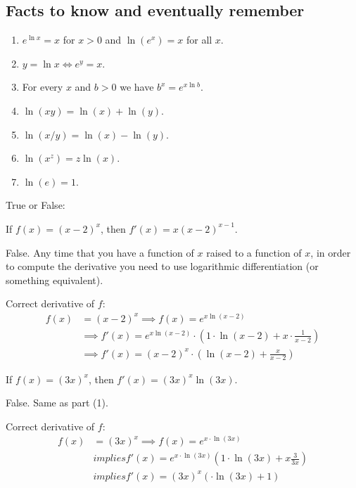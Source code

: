 \documentclass[handout,nooutcomes]{ximera}
\renewenvironment{freeResponse}{
\ifhandout\setbox0\vbox\bgroup\else
\begin{trivlist}\item[\hskip \labelsep\bfseries Solution:\hspace{2ex}]
\fi}
{\ifhandout\egroup\else
\end{trivlist}
\fi}
\begin{document}
\subsection*{Facts to know and eventually remember}
\begin{enumerate}
  \item[(1)]
    $e^{\ln x} = x$ for $x > 0$ and $\ln(e^x) = x$ for all $x$.

  \item[(2)]
    $y = \ln x \iff e^y = x$.

  \item[(3)]
    For every $x$ and $b >0$ we have
    $
      b^x = e^{x \ln b}
    $.

  \item[(4)]
    $\ln(xy) = \ln(x) + \ln(y)$.

  \item[(5)]
    $\ln(x/y) = \ln(x) - \ln(y)$.

  \item[(6)]
    $\ln(x^z) = z \ln(x)$.

  \item[(7)]
    $\ln(e) = 1$.
\end{enumerate}

\begin{problem}
  True or False:
  \begin{enumerate}
    \item[(1)]
      If $f(x) = (x-2)^x$, then $f'(x) = x (x-2)^{x-1}$.
      \begin{freeResponse}
        False.
        Any time that you have a function of $x$ raised to a function of $x$, in order to compute the derivative you need to use logarithmic differentiation (or something equivalent).

        Correct derivative of $f$:
        \begin{align*}
          f(x) &= (x-2)^x \implies f(x) = e^{x \ln(x-2)} \\
          &\implies f'(x) = e^{x \ln(x-2)} \cdot \left(1\cdot\ln(x-2) + x \cdot \frac{1}{x-2}\right) \\
          &\implies f'(x) = (x-2)^x \cdot \left(\ln(x-2) + \frac{x}{x-2}\right)
        \end{align*}
        \end{freeResponse}	
		
      \item[(2)]
        If $f(x) = (3x)^x$, then $f'(x) = (3x)^x \ln (3x)$.
	\begin{freeResponse}
          False.  Same as part (1).

          Correct derivative of $f$:
          \begin{align*}
            f(x) &= (3x)^x \implies f(x) = e^{x \cdot \ln(3x)} \\
            &implies f'(x)  = e^{x \cdot \ln(3x)} \left(1 \cdot \ln(3x) + x \frac{3}{3x} \right) \\
            &implies f'(x)  = (3x)^x \left(\cdot \ln(3x) + 1 \right)
          \end{align*}
	\end{freeResponse}	
	\end{enumerate}
\end{problem}
\end{document}
